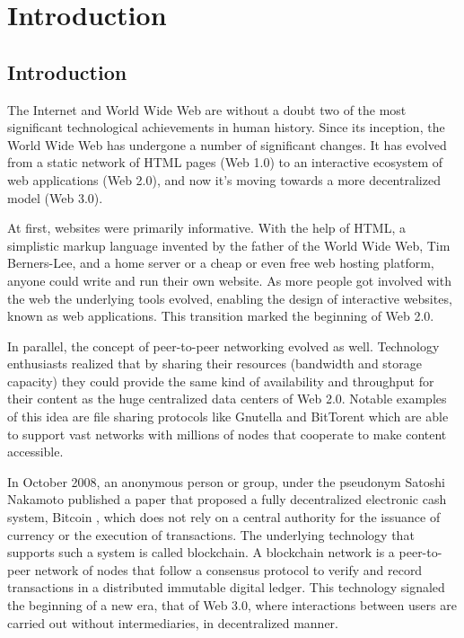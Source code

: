 \chapter{Introduction}\label{chapter:introduction}

\section{Introduction}\label{sec:intro}
The Internet and World Wide Web are without a doubt two of the most significant technological achievements in human history. Since its inception, the World Wide Web has undergone a number of significant changes. It has evolved from a static network of HTML pages (Web 1.0) to an interactive ecosystem of web applications (Web 2.0), and now it's moving towards a more decentralized model (Web 3.0).

At first, websites were primarily informative. With the help of HTML, a simplistic markup language invented by the father of the World Wide Web, Tim Berners-Lee, and a home server or a cheap or even free web hosting platform, anyone could write and run their own website. As more people got involved with the web the underlying tools evolved, enabling the design of interactive websites, known as web applications. This transition marked the beginning of Web 2.0. 

In parallel, the concept of peer-to-peer networking \citep{schollmeier_2001} evolved as well. Technology enthusiasts realized that by sharing their resources (bandwidth and storage capacity) they could provide the same kind of availability and throughput for their content as the huge centralized data centers of Web 2.0. Notable examples of this idea are file sharing protocols like Gnutella \citep{bordignon_2001} and BitTorent \citep{cohen_2008} which are able to support vast networks with millions of nodes that cooperate to make content accessible. 

In October 2008, an anonymous person or group, under the pseudonym Satoshi Nakamoto published a paper that proposed a fully decentralized electronic cash system, Bitcoin \citep{nakamoto_2008}, which does not rely on a central authority for the issuance of currency or the execution of transactions. The underlying technology that supports such a system is called blockchain. A blockchain network is a peer-to-peer network of nodes that follow a consensus protocol to verify and record transactions in a distributed immutable digital ledger. This technology signaled the beginning of a new era, that of Web 3.0, where interactions between users are carried out without intermediaries, in decentralized manner.

